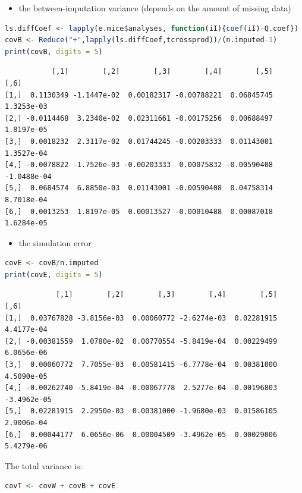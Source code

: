 \documentclass[12pt]{article}
\begin{document}
\begin{itemize}
\item the between-imputation variance (depends on the amount of missing data)
\end{itemize}
\begin{lstlisting}[language=r,numbers=none]
ls.diffCoef <- lapply(e.mice$analyses, function(iI){coef(iI)-Q.coef})
covB <- Reduce("+",lapply(ls.diffCoef,tcrossprod))/(n.imputed-1)
print(covB, digits = 5)
\end{lstlisting}

\label{}
\begin{verbatim}
           [,1]        [,2]        [,3]        [,4]        [,5]        [,6]
[1,]  0.1130349 -1.1447e-02  0.00182317 -0.00788221  0.06845745  1.3253e-03
[2,] -0.0114468  3.2340e-02  0.02311661 -0.00175256  0.00688497  1.8197e-05
[3,]  0.0018232  2.3117e-02  0.01744245 -0.00203333  0.01143001  1.3527e-04
[4,] -0.0078822 -1.7526e-03 -0.00203333  0.00075832 -0.00590408 -1.0488e-04
[5,]  0.0684574  6.8850e-03  0.01143001 -0.00590408  0.04758314  8.7018e-04
[6,]  0.0013253  1.8197e-05  0.00013527 -0.00010488  0.00087018  1.6284e-05
\end{verbatim}


\begin{itemize}
\item the simulation error
\end{itemize}
\begin{lstlisting}[language=r,numbers=none]
covE <- covB/n.imputed
print(covE, digits = 5)
\end{lstlisting}

\label{}
\begin{verbatim}
            [,1]        [,2]        [,3]        [,4]        [,5]        [,6]
[1,]  0.03767828 -3.8156e-03  0.00060772 -2.6274e-03  0.02281915  4.4177e-04
[2,] -0.00381559  1.0780e-02  0.00770554 -5.8419e-04  0.00229499  6.0656e-06
[3,]  0.00060772  7.7055e-03  0.00581415 -6.7778e-04  0.00381000  4.5090e-05
[4,] -0.00262740 -5.8419e-04 -0.00067778  2.5277e-04 -0.00196803 -3.4962e-05
[5,]  0.02281915  2.2950e-03  0.00381000 -1.9680e-03  0.01586105  2.9006e-04
[6,]  0.00044177  6.0656e-06  0.00004509 -3.4962e-05  0.00029006  5.4279e-06
\end{verbatim}


The total variance is:
\begin{lstlisting}[language=r,numbers=none]
covT <- covW + covB + covE
\end{lstlisting}
\end{document}
